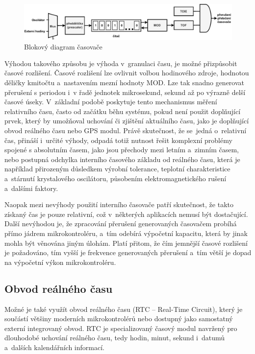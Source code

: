 \begin{figure}[h]
    \centering
    \includegraphics[width=1.00\textwidth]{obrazky-figures/timer-cz.pdf}
    
    \caption{Blokový diagram časovače~\cite{nxp_KL05_Reference_Manual}}
    \label{fig:timer}
\end{figure}

Výhodou takového způsobu je výhoda v~granulaci času, je možné přizpůsobit časové rozlišení. Časové rozlišení lze ovlivnit volbou hodinového zdroje, hodnotou děličky kmitočtu a~nastavením mezní hodnoty MOD. Lze tak snadno generovat přerušení s periodou i~v řadě jednotek mikrosekund, sekund až po výrazně delší časové úseky. V~základní podobě poskytuje tento mechanismus měření relativního času, často od začátku běhu systému, pokud není použit doplňující prvek, který by umožňoval uchování či zjištění aktuálního času, jako je doplňující obvod reálného času nebo GPS modul. Právě skutečnost, že se~jedná o~relativní čas, přináší i~určité výhody, odpadá totiž nutnost řešit komplexní problémy spojené s absolutním časem, jako jsou přechody mezi letním a~zimním časem, nebo postupná odchylka interního časového základu od reálného času, která je například přirozeným důsledkem výrobní tolerance, teplotní charakteristice a~stárnutí krystalového oscilátoru, působením elektromagnetického rušení a~dalšími faktory.~\cite{ti_rtc}

Naopak mezi nevýhody použití interního časovače patří skutečnost, že takto získaný čas je pouze relativní, což v~některých aplikacích nemusí být dostačující. Další nevýhodou je, že zpracování přerušení generovaných časovačem probíhá přímo jádrem mikrokontroléru, a~tím odebírá výpočetní kapacitu, která by jinak mohla být věnována jiným úlohám. Platí přitom, že čím jemnější časové rozlišení je požadováno, tím vyšší je frekvence generovaných přerušení a~tím větší je dopad na výpočetní výkon mikrokontroléru.

\subsection{Obvod reálného času}
\label{real_time_circuit}
Možné je také využít obvod reálného času (RTC -- Real-Time Circuit), který je součástí většiny moderních mikrokontrolérů nebo dostupný jako samostatný externí integrovaný obvod. RTC je specializovaný časový modul navržený pro dlouhodobé uchování reálného času, tedy hodin, minut, sekund i~datumů a~dalších kalendářních informací.

